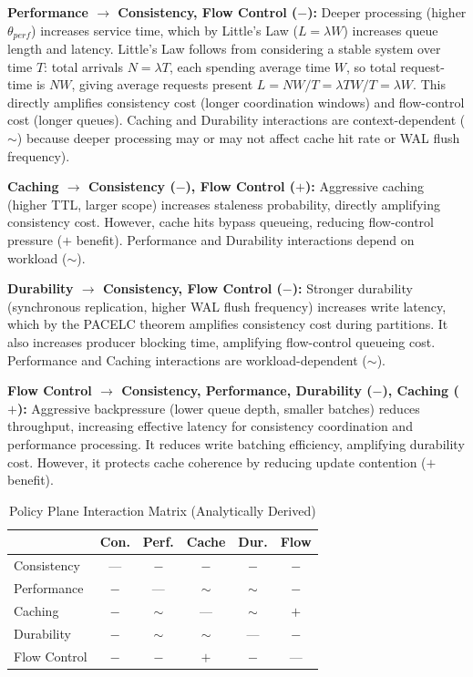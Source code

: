 \documentclass[conference]{IEEEtran}
\begin{document}
\textbf{Performance $\to$ Consistency, Flow Control ($-$):} Deeper processing (higher $\theta_{perf}$) increases service time, which by Little's Law ($L = \lambda W$) increases queue length and latency. Little's Law follows from considering a stable system over time $T$: total arrivals $N = \lambda T$, each spending average time $W$, so total request-time is $NW$, giving average requests present $L = NW/T = \lambda TW/T = \lambda W$. This directly amplifies consistency cost (longer coordination windows) and flow-control cost (longer queues). Caching and Durability interactions are context-dependent ($\sim$) because deeper processing may or may not affect cache hit rate or WAL flush frequency).

\textbf{Caching $\to$ Consistency ($-$), Flow Control ($+$):} Aggressive caching (higher TTL, larger scope) increases staleness probability, directly amplifying consistency cost. However, cache hits bypass queueing, reducing flow-control pressure ($+$ benefit). Performance and Durability interactions depend on workload ($\sim$).

\textbf{Durability $\to$ Consistency, Flow Control ($-$):} Stronger durability (synchronous replication, higher WAL flush frequency) increases write latency, which by the PACELC theorem amplifies consistency cost during partitions. It also increases producer blocking time, amplifying flow-control queueing cost. Performance and Caching interactions are workload-dependent ($\sim$).

\textbf{Flow Control $\to$ Consistency, Performance, Durability ($-$), Caching ($+$):} Aggressive backpressure (lower queue depth, smaller batches) reduces throughput, increasing effective latency for consistency coordination and performance processing. It reduces write batching efficiency, amplifying durability cost. However, it protects cache coherence by reducing update contention ($+$ benefit).

\begin{table}[t]
\caption{Policy Plane Interaction Matrix (Analytically Derived)}
\label{tab:interactions}
\centering
\small
\begin{tabular}{@{}l c c c c c@{}}
\toprule
& Con. & Perf. & Cache & Dur. & Flow \\
\midrule
Consistency & --- & $-$ & $-$ & $-$ & $-$ \\
Performance & $-$ & --- & $\sim$ & $\sim$ & $-$ \\
Caching & $-$ & $\sim$ & --- & $\sim$ & $+$ \\
Durability & $-$ & $\sim$ & $\sim$ & --- & $-$ \\
Flow Control & $-$ & $-$ & $+$ & $-$ & --- \\
\bottomrule
\end{tabular}
\end{table}
\end{document}
